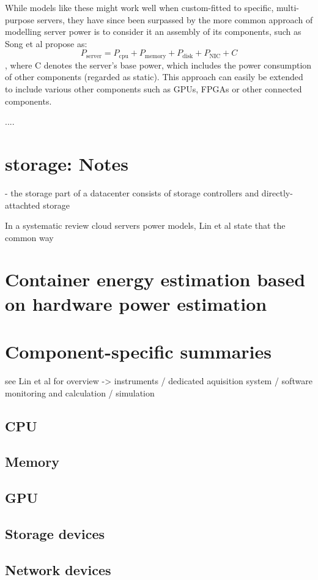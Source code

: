 While models like these might work well when custom-fitted to specific, multi-purpose servers, they have since been surpassed by the more common approach of modelling server power is to consider it an assembly of its components, such as Song et al\parencite{song2013unified} propose as:
\begin{equation}
    P_{\text{server}} = P_{\text{cpu}} + P_{\text{memory}} + P_{\text{disk}} + P_{\text{NIC}} + C
\end{equation}
, where C denotes the server's base power, which includes the power consumption of other components (regarded as static). This approach can easily be extended to include various other components such as GPUs, FPGAs or other connected components.


....





\section{storage: Notes}
- the storage part of a datacenter consists of storage controllers and directly-attachted storage




In a systematic review cloud servers power models, Lin et al\parencite{lin2020taxonomy} state that the common way
\section{Container energy estimation based on hardware power estimation}


\section{Component-specific summaries}
\label{sec:component_specific_summaries}

see Lin et al for overview -> instruments / dedicated aquisition system / software monitoring and calculation / simulation

\subsection{CPU}

\subsection{Memory}

\subsection{GPU}

\subsection{Storage devices}

\subsection{Network devices}